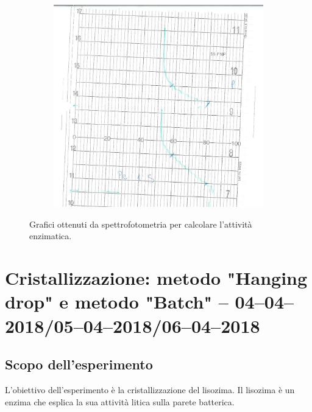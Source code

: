 \documentclass[twocolumn,a4paper,10pt]{my_report}
\begin{document}
{{\begin{figure}[htbp]
\begin{subfigure}{0.5\linewidth}
\includegraphics[width=0.8\linewidth]{analisi3.jpg}
\label{fig:analisi3}
\end{subfigure}
\caption{Grafici ottenuti da spettrofotometria per calcolare l'attività enzimatica.}
\label{fig:Risultati}
\end{figure}

\begin{table}[htbp]
\centering

\caption{}
\end{table}


\begin{table}[htbp]
\centering

\caption{}
\end{table}

\begin{table}[htbp]
\centering

\caption{}
\end{table}

}


\section*{Cristallizzazione: metodo "Hanging drop" e metodo "Batch" -- 04--04--2018/05--04--2018/06--04--2018}
\subsection*{Scopo dell'esperimento}
L'obiettivo dell'esperimento è la cristallizzazione del lisozima. Il lisozima è un enzima che esplica la sua attività litica sulla parete batterica.

}
\end{document}
